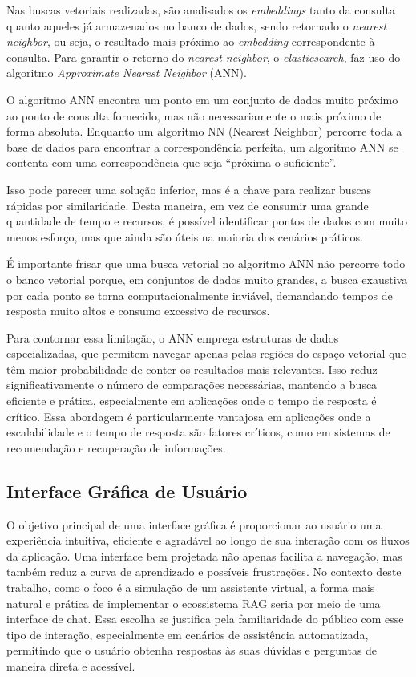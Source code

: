 \documentclass[a4paper, 12pt]{article}
\begin{document}
    Nas buscas vetoriais realizadas, são analisados os \textit{embeddings} tanto da consulta quanto aqueles já armazenados no banco de dados, sendo retornado o \textit{nearest neighbor}, ou seja, o resultado mais próximo ao \textit{embedding} correspondente à consulta. Para garantir o retorno do \textit{nearest neighbor}, o \textit{elasticsearch}, faz uso do algoritmo \textit{Approximate Nearest Neighbor} (ANN).
    
    O algoritmo ANN encontra um ponto em um conjunto de dados muito próximo ao ponto de consulta fornecido, mas não necessariamente o mais próximo de forma absoluta. Enquanto um algoritmo NN (Nearest Neighbor) percorre toda a base de dados para encontrar a correspondência perfeita, um algoritmo ANN se contenta com uma correspondência que seja ``próxima o suficiente''. 
    
    Isso pode parecer uma solução inferior, mas é a chave para realizar buscas rápidas por similaridade. Desta maneira, em vez de consumir uma grande quantidade de tempo e recursos, é possível identificar pontos de dados com muito menos esforço, mas que ainda são úteis na maioria dos cenários práticos.
    
    É importante frisar que uma busca vetorial no algoritmo ANN não percorre todo o banco vetorial porque, em conjuntos de dados muito grandes, a busca exaustiva por cada ponto se torna computacionalmente inviável, demandando tempos de resposta muito altos e consumo excessivo de recursos. 
    
    Para contornar essa limitação, o ANN emprega estruturas de dados especializadas, que permitem navegar apenas pelas regiões do espaço vetorial que têm maior probabilidade de conter os resultados mais relevantes. Isso reduz significativamente o número de comparações necessárias, mantendo a busca eficiente e prática, especialmente em aplicações onde o tempo de resposta é crítico. Essa abordagem é particularmente vantajosa em aplicações onde a escalabilidade e o tempo de resposta são fatores críticos, como em sistemas de recomendação e recuperação de informações.
    

    \subsection{Interface Gráfica de Usuário}
    
    O objetivo principal de uma interface gráfica é proporcionar ao usuário uma experiência intuitiva, eficiente e agradável ao longo de sua interação com os fluxos da aplicação. Uma interface bem projetada não apenas facilita a navegação, mas também reduz a curva de aprendizado e possíveis frustrações. No contexto deste trabalho, como o foco é a simulação de um assistente virtual, a forma mais natural e prática de implementar o ecossistema RAG seria por meio de uma interface de chat. Essa escolha se justifica pela familiaridade do público com esse tipo de interação, especialmente em cenários de assistência automatizada, permitindo que o usuário obtenha respostas às suas dúvidas e perguntas de maneira direta e acessível.
\end{document}
